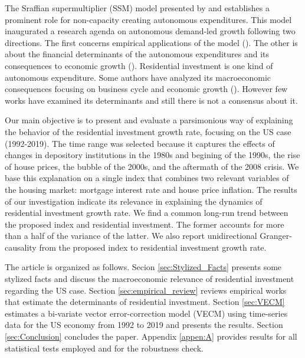\documentclass[12pt, a4paper]{article}
\begin{document}
The Sraffian supermultiplier (SSM) model presented by \textcite{serrano_long_1995} and \textcite{bortis_institutions_1997} establishes a prominent role for non-capacity creating autonomous expenditures.
This model inaugurated a research agenda on autonomous demand-led growth following two directions.
The first concerns empirical applications of the model (\cites{freitas_pattern_2013}{girardi_long-run_2016}{girardi_autonomous_2018}{Braga2020}{Haluska2020}).
The other is about the financial determinants of the autonomous expenditures and its consequences to economic growth (\cites{Pariboni2016}{brochier_supermultiplier_2018}{Mandarino2020}{petrini_2021_TD}).
Residential investment is one kind of autonomous expenditure.
Some authors have analyzed its macroeconomic consequences focusing on business cycle and economic growth  (\cite{fiebiger_trend_2017,fiebiger_semi-autonomous_2018,perez_Montiel_2021,petrini_2021_TD}).
However few works have examined its determinants and still there is not a consensus about it.

Our main objective is to present and evaluate a parsimonious way of explaining the behavior of the residential investment growth rate, focusing on the US case (1992-2019).
The time range was selected because it captures the effects of changes in depository institutions in the 1980s and  begining of the 1990s, the rise of house prices, the bubble of the 2000s, and the aftermath of the 2008 crisis.
We base this explanation on a single index that combines two relevant variables of the housing market: mortgage interest rate and house price inflation.
The results of our investigation indicate its relevance in explaining the dynamics of residential investment growth rate.
We find a common long-run trend between the proposed index and residential investment.
The former accounts for more than a half of the variance of the latter.
We also report unidirectional Granger-causality from the proposed index to residential investment growth rate.

The article is organized as follows.
Secion \ref{sec:Stylized_Facts} presents some stylized facts and discuss the macroeconomic relevance of residential investment regarding the US case.
Section \ref{sec:empirical_review} reviews empirical works that estimate the determinants of residential investment.
Section \ref{sec:VECM} estimates a bi-variate vector error-correction model (VECM) using time-series data for the US economy from 1992 to 2019 and presents the results.
Section \ref{sec:Conclusion} concludes the paper.
Appendix \ref{appen:A} provides results for all statistical tests employed and for the robustness check.
\end{document}
